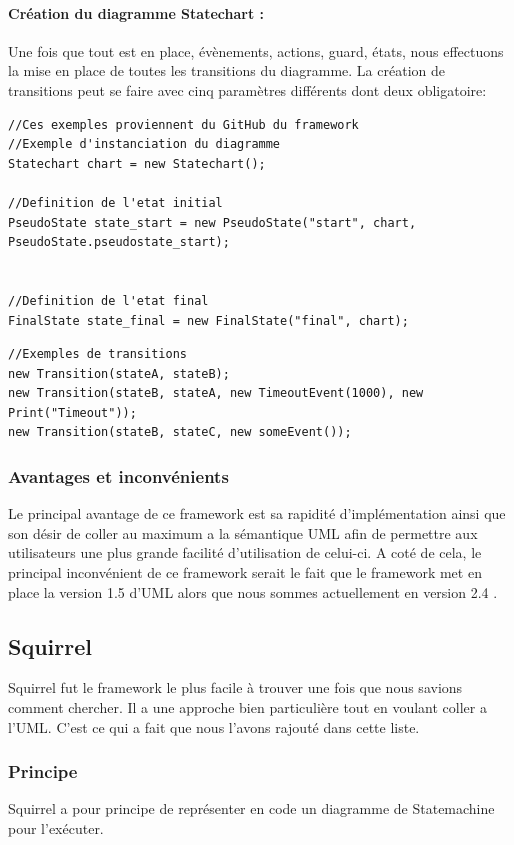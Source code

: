 \documentclass[french, 12pt, a4paper]{article}
\begin{document}
        \paragraph{Création du diagramme Statechart :}
        Une fois que tout est en place, évènements, actions, guard,  états, nous effectuons la mise en place de toutes les transitions du diagramme. La création de transitions peut se faire avec cinq paramètres différents dont deux obligatoire: 
        \begin{lstlisting}
//Ces exemples proviennent du GitHub du framework
//Exemple d'instanciation du diagramme
Statechart chart = new Statechart();

//Definition de l'etat initial
PseudoState state_start = new PseudoState("start", chart, PseudoState.pseudostate_start);


//Definition de l'etat final
FinalState state_final = new FinalState("final", chart);
        \end{lstlisting}
        
        \begin{lstlisting}
//Exemples de transitions
new Transition(stateA, stateB);
new Transition(stateB, stateA, new TimeoutEvent(1000), new Print("Timeout"));
new Transition(stateB, stateC, new someEvent());
        \end{lstlisting}
        
        \subsubsection{Avantages et inconvénients}
        Le principal avantage de ce framework est sa rapidité d'implémentation ainsi que son désir de coller au maximum a la sémantique UML afin de permettre aux utilisateurs une plus grande facilité d'utilisation de celui-ci. A coté de cela, le principal inconvénient de ce framework serait le fait que le framework met en place la version 1.5 d'UML alors que nous sommes actuellement en version 2.4 .
    
    \subsection{Squirrel}
    Squirrel fut le framework le plus facile à trouver une fois que nous savions comment chercher. Il a une approche bien particulière tout en voulant coller a l'UML. C'est ce qui a fait que nous l'avons rajouté dans cette liste.
    
        \subsubsection{Principe}
        Squirrel a pour principe de représenter en code un diagramme de Statemachine pour l'exécuter.
        
\end{document}
